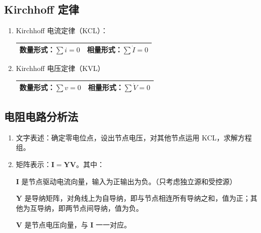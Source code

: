 \documentclass[UTF8,fontset=fandol,zihao=5]{ctexart}
\begin{document}
\subsection{Kirchhoff 定律}

\begin{enumerate}
  \item Kirchhoff 电流定律（KCL）：

  \begin{center}
    \begin{tabularx}{0.92\textwidth}{XX}
      \toprule
      数量形式：\(\displaystyle\sum i=0\) & 相量形式：\(\displaystyle\sum\dot I=0\) \\
      \bottomrule
    \end{tabularx}
  \end{center}

  \item Kirchhoff 电压定律（KVL）

  \begin{center}
    \begin{tabularx}{0.92\textwidth}{XX}
      \toprule
      数量形式：\(\displaystyle\sum v=0\) & 相量形式：\(\displaystyle\sum\dot V=0\) \\
      \bottomrule
    \end{tabularx}
  \end{center}
\end{enumerate}

\subsection{电阻电路分析法}

\begin{methodbox}[【方法】节点电压法]
\begin{enumerate}
    \item 文字表述：确定零电位点，设出节点电压，对其他节点运用 KCL，求解方程组。
    
    \item 矩阵表示：\(\boldsymbol{I}=\boldsymbol{YV}\)。其中：

    \(\boldsymbol{I}\) 是节点驱动电流向量，输入为正输出为负。（只考虑独立源和受控源）

    \(\boldsymbol{Y}\) 是导纳矩阵，对角线上为自导纳，即与节点相连所有导纳之和，值为正；其他为互导纳，即两节点间导纳，值为负。

    \(\boldsymbol{V}\) 是节点电压向量，与 \(\boldsymbol{I}\) 一一对应。
\end{enumerate}
\end{methodbox}
\end{document}
